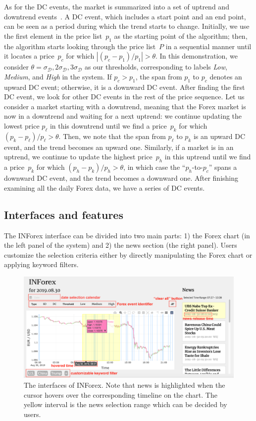 \documentclass[sigconf]{acmart}
\begin{document}
As for the DC events, the market is summarized into a set of uptrend and
downtrend events~\cite{7850020}.
A DC event, which includes a start point and an end point, can be seen as a period
during which the trend starts to change.
Initially, we use the first element in the price list~$p_1$ as the starting point
of the algorithm; then, the algorithm starts looking through the price list~$P$
in a sequential manner until it locates a price~$p_c$ for which
$|{(p_c-p_1)}/{p_1}|>\theta$.
In this demonstration, we consider
$\theta=\sigma_{\mathcal{D}},2\sigma_{\mathcal{D}},3\sigma_{\mathcal{D}}$ as
our thresholds, corresponding to labels \emph{Low},
\emph{Medium}, and \emph{High} in the system.
If $p_c > p_1$, the span from $p_1$ to $p_c$ denotes an upward DC event;
otherwise, it is a downward DC event.
After finding the first DC event, we look for other DC events in the
rest of the price sequence.
Let us consider a market starting with a downtrend, meaning that the Forex market
is now in a downtrend and waiting for a next uptrend: we continue
updating the lowest price $p_\ell$ in this downtrend until we find a 
price~$p_k$ for which ${(p_k-p_\ell)}/{p_\ell}>\theta$. Then, we note that the span from
$p_\ell$ to $p_k$ is an upward DC event, and the trend becomes an upward one.
Similarly, if a market is in an uptrend, we continue to update the highest 
price~$p_h$ in this uptrend until we find a price~$p_k$ for which
${(p_h-p_k)}/{p_h}>\theta$, in which case the ``$p_h$-to-$p_c$'' spans a downward DC
event, and the trend becomes a downward one.
After finishing examining all the daily Forex data, we have a series of DC events.




\subsection{Interfaces and features}
The INForex interface can be divided into two main parts: 1) the Forex chart
(in the left panel of the system) and 2) the news section (the right panel).
Users customize the selection criteria either by directly
manipulating the Forex chart or applying keyword filters.

\begin{figure}[h]
  \centering
  \includegraphics[width=\linewidth]{hover.pdf}
  \caption{The interfaces of INForex. Note that news is highlighted when the cursor hovers over the
  corresponding timeline on the chart. The yellow interval is the news
  selection range which can be decided by users.}
  \label{fig:hover}
\end{figure}
\end{document}
